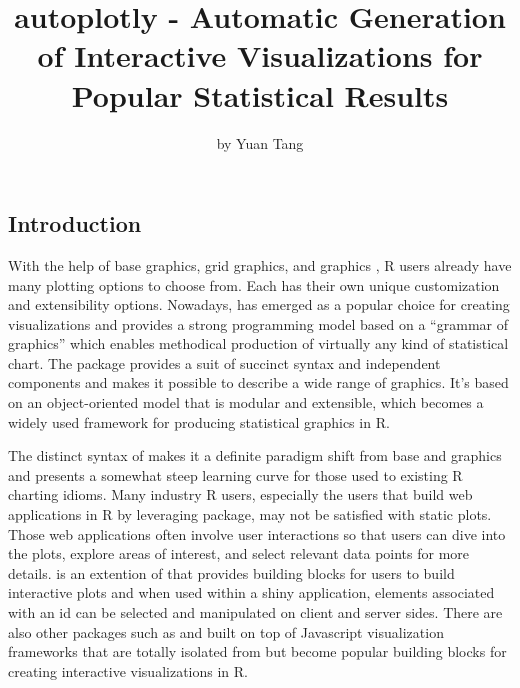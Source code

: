 \title{autoplotly - Automatic Generation of Interactive Visualizations for
Popular Statistical Results}
\author{by Yuan Tang}

\maketitle


\subsection{Introduction}\label{introduction}

With the help of base graphics, grid graphics, and 
graphics \citep{lattice}, R users already have many plotting options to
choose from. Each has their own unique customization and extensibility
options. Nowadays,  has emerged as a popular choice for
creating visualizations \citep{wickham2009ggplot2} and provides a strong
programming model based on a ``grammar of graphics'' which enables
methodical production of virtually any kind of statistical chart. The
 package provides a suit of succinct syntax and independent
components and makes it possible to describe a wide range of graphics.
It's based on an object-oriented model that is modular and extensible,
which becomes a widely used framework for producing statistical graphics
in R.

The distinct syntax of  makes it a definite paradigm shift
from base and  graphics and presents a somewhat steep
learning curve for those used to existing R charting idioms. Many
industry R users, especially the users that build web applications in R
by leveraging  \citep{shiny} package, may not be
satisfied with static plots. Those web applications often involve user
interactions so that users can dive into the plots, explore areas of
interest, and select relevant data points for more details.
 \citep{ggiraph} is an extention of  that
provides building blocks for users to build interactive plots and when
used within a shiny application, elements associated with an id can be
selected and manipulated on client and server sides. There are also
other packages such as  \citep{d3r} and 
\citep{plotly} built on top of Javascript visualization frameworks that
are totally isolated from  but become popular building
blocks for creating interactive visualizations in R.

